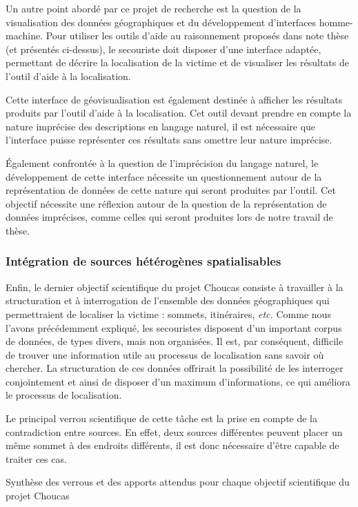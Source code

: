 Un autre point abordé par ce projet de recherche est la question de la
visualisation des données géographiques et du développement
d'interfaces homme-machine. Pour utiliser les outils d'aide au
raisonnement proposés dans note thèse (et présentés ci-dessus), le
secouriste doit disposer d'une interface adaptée, permettant de
décrire la localisation de la victime et de visualiser les résultats
de l'outil d'aide à la localisation. 

Cette interface de géovisualisation est également destinée à afficher
les résultats produits par l'outil d'aide à la localisation. Cet outil
devant prendre en compte la nature imprécise des descriptions en
langage naturel, il est nécessaire que l'interface puisse représenter
ces résultats sans omettre leur nature imprécise.  

Également confrontée à la question de l'imprécision du langage
naturel, le développement de cette interface nécessite un
questionnement autour de la représentation de données de cette nature
qui seront produites par l'outil. Cet objectif nécessite une réflexion
autour de la question de la représentation de données imprécises,
comme celles qui seront produites lors de notre travail de thèse.

\autocite{Viry2019a}

\subsubsection{Intégration de sources hétérogènes spatialisables}
\label{subsec:1-2-3-4}

Enfin, le dernier objectif scientifique du projet Choucas consiste à
travailler à la structuration et à interrogation de l'ensemble des
données géographiques qui permettraient de localiser la victime :
sommets, itinéraires, \emph{etc.} Comme nous l'avons précédemment
expliqué, les secouristes disposent d'un important corpus de données,
de types divers, mais non organisées. Il est, par conséquent,
difficile de trouver une information utile au processus de
localisation sans savoir où chercher. La structuration de ces données
offrirait la possibilité de les interroger conjointement et ainsi de
disposer d'un maximum d'informations, ce qui améliora le processus de
localisation.

Le principal verrou scientifique de cette tâche est la prise en compte
de la contradiction entre sources. En effet, deux sources différentes
peuvent placer un même sommet à des endroits différents, il est donc
nécessaire d'être capable de traiter ces cas.

\autocite{VanDamme2019,Halilali2018}

\begin{landscape}
\begin{table}[H]
  \centering
  
  \caption{Synthèse des verrous et des apports attendus pour chaque
    objectif scientifique du projet Choucas}
  \label{tab:synthese_objectifs_choucas}
\end{table}
\end{landscape}

